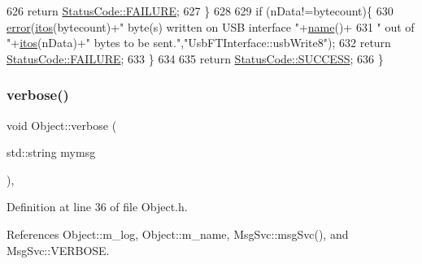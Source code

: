 \begin{DoxyCode}
626     \textcolor{keywordflow}{return} \hyperlink{classStatusCode_a6f565cbeadc76d14c72f047e5e85eb4ba3da73d4c469762eb9d3c960368252b26}{StatusCode::FAILURE};
627   \}
628 
629   \textcolor{keywordflow}{if} (nData!=bytecount)\{
630     \hyperlink{classObject_a204a95f57818c0f811933917a30eff45}{error}(\hyperlink{Tools_8h_af330027dbdafb9a30768b3613c553e60}{itos}(bytecount)+\textcolor{stringliteral}{" byte(s) written on USB interface "}+\hyperlink{classObject_a300f4c05dd468c7bb8b3c968868443c1}{name}()+
631             \textcolor{stringliteral}{" out of "}+\hyperlink{Tools_8h_af330027dbdafb9a30768b3613c553e60}{itos}(nData)+\textcolor{stringliteral}{" bytes to be sent."},\textcolor{stringliteral}{"UsbFTInterface::usbWrite8"});
632     \textcolor{keywordflow}{return} \hyperlink{classStatusCode_a6f565cbeadc76d14c72f047e5e85eb4ba3da73d4c469762eb9d3c960368252b26}{StatusCode::FAILURE};    
633   \}
634 
635   \textcolor{keywordflow}{return} \hyperlink{classStatusCode_a6f565cbeadc76d14c72f047e5e85eb4badd0da38d3ba0d922efd1f4619bc37ad8}{StatusCode::SUCCESS};  
636 \}
\end{DoxyCode}
\mbox{\label{classObject_a83d2db2df682907ea1115ad721c1c4a1}} 
\subsubsection{\texorpdfstring{verbose()}{verbose()}\hspace{0.1cm}{\footnotesize\ttfamily [1/2]}}
{\footnotesize\ttfamily void Object\+::verbose (\begin{DoxyParamCaption}\item[{std\+::string}]{mymsg }\end{DoxyParamCaption})\hspace{0.3cm}{\ttfamily [inline]}, {\ttfamily [inherited]}}



Definition at line 36 of file Object.\+h.



References Object\+::m\+\_\+log, Object\+::m\+\_\+name, Msg\+Svc\+::msg\+Svc(), and Msg\+Svc\+::\+V\+E\+R\+B\+O\+SE.



